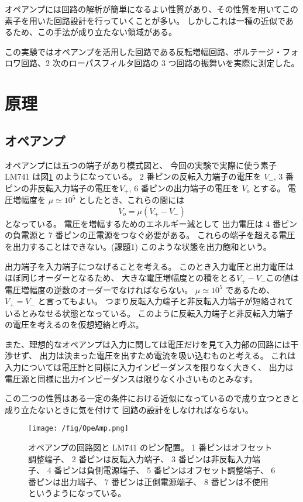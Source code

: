 \documentclass[11pt,dvipdfmx,a4paper]{jsarticle}
\begin{document}
オペアンプには回路の解析が簡単になるよい性質があり、その性質を用いてこの素子を用いた回路設計を行っていくことが多い。
しかしこれは一種の近似であるため、この手法が成り立たない領域がある。

この実験ではオペアンプを活用した回路である反転増幅回路、ボルテージ・フォロワ回路、2 次のローパスフィルタ回路の 3 つ回路の振舞いを実際に測定した。

\section{原理}
\subsection{オペアンプ}

オペアンプには五つの端子があり模式図と、
今回の実験で実際に使う素子 LM741 は図\ref{fig:no1} のようになっている。
2 番ピンの反転入力端子の電圧を \(V_{-}\), 3 番ピンの非反転入力端子の電圧を\(V_{+}\), 6 番ピンの出力端子の電圧を \(V_o\) とする。
電圧増幅度を \(\mu\simeq 10^5\) としたとき、これらの間には
\begin{equation}
	V_o = \mu (V_{+} - V_{-})
\end{equation}
となっている。
電圧を増幅するためのエネルギー減として
出力電圧は 4 番ピンの負電源と 7 番ピンの正電源をつなぐ必要がある。
これらの端子を超える電圧を出力することはできない。(課題1)
このような状態を出力飽和という。

出力端子を入力端子につなげることを考える。
このとき入力電圧と出力電圧はほぼ同じオーダーとなるため、
大きな電圧増幅度との積をとる\(V_{+} - V_{-}\)この値は 電圧増幅度の逆数のオーダーでなければならない。
\(\mu\simeq10^5\) であるため、\(V_{+}=V_{-}\) と言ってもよい。
つまり反転入力端子と非反転入力端子が短絡されているとみなせる状態となっている。
このように反転入力端子と非反転入力端子の電圧を考えるのを仮想短絡と呼ぶ。

また、理想的なオペアンプは入力に関しては電圧だけを見て入力部の回路には干渉せず、
出力は決まった電圧を出すため電流を吸い込むものと考える。
これは入力については電圧計と同様に入力インピーダンスを限りなく大きく、
出力は電圧源と同様に出力インピーダンスは限りなく小さいものとみなす。

この二つの性質はある一定の条件における近似になっているので成り立つときと成り立たないときに気を付けて
回路の設計をしなければならない。
\begin{figure}[H]
	\centering
	\texttt{[image: /fig/OpeAmp.png]}
	\caption{オペアンプの回路図と LM741 のピン配置。
	1 番ピンはオフセット調整端子、
	2 番ピンは反転入力端子、
	3 番ピンは非反転入力端子、
	4 番ピンは負側電源端子、
	5 番ピンはオフセット調整端子、
	6 番ピンは出力端子、
	7 番ピンは正側電源端子、
	8 番ピンは不使用というようになっている。}
	\label{fig:no1}
\end{figure}
\newpage
\end{document}
